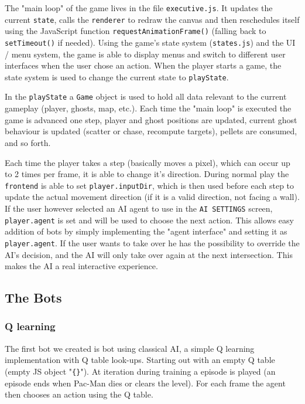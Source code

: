 \documentclass[10pt, letterpaper]{article}
\begin{document}
            The "main loop" of the game lives in the file \texttt{executive.js}. It updates the current \texttt{state}, calls the \texttt{renderer} to redraw the canvas and then reschedules itself using the JavaScript function \texttt{requestAnimationFrame()} (falling back to \texttt{setTimeout()} if needed). Using the game's state system (\texttt{states.js}) and the UI / menu system, the game is able to display menus and switch to different user interfaces when the user chose an action. When the player starts a game, the state system is used to change the current state to \texttt{playState}.
            
            In the \texttt{playState} a \texttt{Game} object is used to hold all data relevant to the current gameplay (player, ghosts, map, etc.). Each time the "main loop" is executed the game is advanced one step, player and ghost positions are updated, current ghost behaviour is updated (scatter or chase, recompute targets), pellets are consumed, and so forth.
            
            Each time the player takes a step (basically moves a pixel), which can occur up to 2 times per frame, it is able to change it's direction. During normal play the \texttt{frontend} is able to set \texttt{player.inputDir}, which is then used before each step to update the actual movement direction (if it is a valid direction, not facing a wall). If the user however selected an AI agent to use in the \texttt{AI SETTINGS} screen, \texttt{player.agent} is set and will be used to choose the next action. This allows easy addition of bots by simply implementing the "agent interface" and setting it as \texttt{player.agent}. If the user wants to take over he has the possibility to override the AI's decision, and the AI will only take over again at the next intersection. This makes the AI a real interactive experience.
        
        \subsection{The Bots}
            \subsubsection*{Q learning}
                The first bot we created is bot using classical AI, a simple Q learning implementation with Q table look-ups. Starting out with an empty Q table (empty JS object "\texttt{\{\}}"). At iteration during training a episode is played (an episode ends when Pac-Man dies or clears the level). For each frame the agent then chooses an action using the Q table.
                
\end{document}
